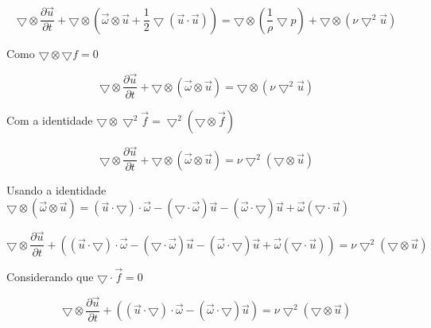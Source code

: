 \documentclass[12pt]{article}
\begin{document}
\begin{equation}
	\bigtriangledown \otimes \frac{\partial \vec{u}}{\partial t} + \bigtriangledown \otimes \left( \vec{\omega} \otimes \vec{u} + \frac{1}{2} \bigtriangledown(\vec{u}\cdot \vec{u})\right)   = \bigtriangledown \otimes \left( \frac{1}{\rho} \bigtriangledown p\right)  + \bigtriangledown \otimes \left( \nu \bigtriangledown^2 \vec{u} \right) 
\end{equation}

Como $\bigtriangledown \otimes \bigtriangledown f = 0$


\begin{equation}
	\bigtriangledown \otimes \frac{\partial \vec{u}}{\partial t} + \bigtriangledown \otimes \left( \vec{\omega} \otimes \vec{u} \right)   = \bigtriangledown \otimes \left( \nu \bigtriangledown^2 \vec{u} \right) 
\end{equation}

Com a identidade $\bigtriangledown \otimes \bigtriangledown^2 \vec{f} = \bigtriangledown^2(\bigtriangledown \otimes \vec{f})$

\begin{equation}
	\bigtriangledown \otimes \frac{\partial \vec{u}}{\partial t} + \bigtriangledown \otimes \left( \vec{\omega} \otimes \vec{u} \right)   = \nu\bigtriangledown^2 \left(  \bigtriangledown \otimes \vec{u} \right) 
\end{equation}

Usando a identidade $\bigtriangledown \otimes (\vec{\omega} \otimes \vec{u}) = (\vec{u} \cdot \bigtriangledown) \cdot \vec{\omega} - (\bigtriangledown \cdot \vec{\omega}) \vec{u} - (\vec{\omega}\cdot \bigtriangledown) \vec{u} + \vec{\omega}(\bigtriangledown \cdot \vec{u}) $

\begin{equation}
	\bigtriangledown \otimes \frac{\partial \vec{u}}{\partial t} + \left( (\vec{u} \cdot \bigtriangledown) \cdot \vec{\omega} - (\bigtriangledown \cdot \vec{\omega}) \vec{u} - (\vec{\omega}\cdot \bigtriangledown) \vec{u} + \vec{\omega}(\bigtriangledown \cdot \vec{u})\right)   = \nu\bigtriangledown^2 \left(  \bigtriangledown \otimes \vec{u} \right) 
\end{equation}

Considerando que $ \bigtriangledown \cdot \vec{f} = 0$

\begin{equation}
	\bigtriangledown \otimes \frac{\partial \vec{u}}{\partial t} + \left( (\vec{u} \cdot \bigtriangledown) \cdot \vec{\omega}  - (\vec{\omega}\cdot \bigtriangledown) \vec{u}\right)   = \nu\bigtriangledown^2 \left(  \bigtriangledown \otimes \vec{u} \right) 
\end{equation}
\end{document}
